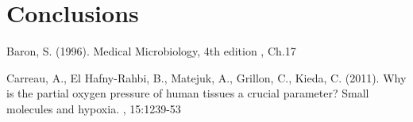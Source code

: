 \documentclass[twoside]{article}
\begin{document}
\section{Conclusions}
\lipsum[4]

%	
%
%


\begin{thebibliography}{1}
Baron, S. (1996).
\newblock Medical Microbiology, 4th edition
, Ch.17

Carreau, A., El Hafny-Rahbi, B., Matejuk, A., Grillon, C., Kieda, C. (2011).
\newblock Why is the partial oxygen pressure of human tissues a crucial parameter? Small molecules and hypoxia.
, 15:1239-53
\end{thebibliography}
\end{document}
